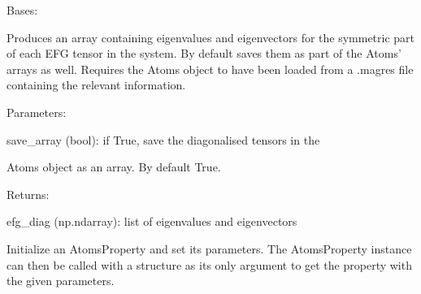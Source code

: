 \documentclass[letterpaper,10pt,english]{sphinxmanual}
\begin{document}
\begin{fulllineitems}
\label{doctree/soprano.properties.nmr.efg:soprano.properties.nmr.efg.EFGDiagonal}
Bases: {\hyperref[doctree/soprano.properties.atomsproperty:soprano.properties.atomsproperty.AtomsProperty]{}}

Produces an array containing eigenvalues and eigenvectors for the
symmetric part of each EFG tensor in the system. By default
saves them as part of the Atoms' arrays as well.
Requires the Atoms object to have been loaded from a .magres file
containing the relevant information.

\begin{DUlineblock}{0em}
\item[] Parameters:
\item[]
\begin{DUlineblock}{\DUlineblockindent}
\item[] save\_array (bool): if True, save the diagonalised tensors in the
\item[]
\begin{DUlineblock}{\DUlineblockindent}
\item[] Atoms object as an array. By default True.
\end{DUlineblock}
\end{DUlineblock}
\end{DUlineblock}

\begin{DUlineblock}{0em}
\item[] Returns:
\item[]
\begin{DUlineblock}{\DUlineblockindent}
\item[] efg\_diag (np.ndarray): list of eigenvalues and eigenvectors
\end{DUlineblock}
\end{DUlineblock}

Initialize an AtomsProperty and set its parameters.
The AtomsProperty instance can then be called with a structure as its
only argument to get the property with the given parameters.


\end{fulllineitems}
\end{document}
